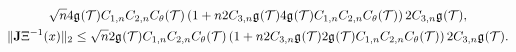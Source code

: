 \documentclass[10pt,a4paper]{article}
\begin{document}
\begin{itemize}
\begin{gather*}
            \sqrt{n}
            4 
            \geometricshapemeasure(\calT) 
            \Ceins{n} 
            \Czwei{n} 
            \diameterratio(\calT) %
            \left( 
                1
                + 
                n
                2 \Cdrei{n} \geometricshapemeasure(\calT)
                4 
                \geometricshapemeasure(\calT) 
                \Ceins{n} 
                \Czwei{n} 
                \diameterratio(\calT) %
            \right) 
            2 \Cdrei{n} \geometricshapemeasure(\calT)
            ,
            \\
            \matnorm{ \Jacobian \Xi^{-1}(x) }
            \leq 
            \sqrt{n}
            2 
            \geometricshapemeasure(\calT) 
            \Ceins{n} 
            \Czwei{n} 
            \diameterratio(\calT) %
            \left( 
                1
                + 
                n
                2 \Cdrei{n} \geometricshapemeasure(\calT)
                2 
                \geometricshapemeasure(\calT) 
                \Ceins{n} 
                \Czwei{n} 
                \diameterratio(\calT) %
            \right) 
            2 \Cdrei{n} \geometricshapemeasure(\calT)
            .
        \end{gather*}
\end{itemize}
\end{document}

